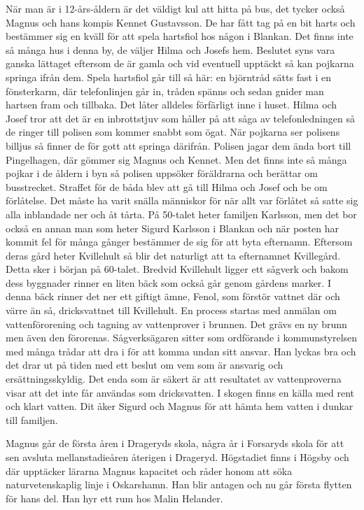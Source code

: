 När man är i 12-års-åldern är det väldigt kul att hitta på bus, det tycker också Magnus och hans kompis Kennet Gustavsson. De har fått tag på en bit harts och bestämmer sig en kväll för att spela hartsfiol hos någon i Blankan. Det finns inte så många hus i denna by, de väljer Hilma och Josefs hem. Beslutet syns vara ganska lättaget eftersom de är gamla och vid eventuell upptäckt så kan pojkarna springa ifrån dem. Spela hartsfiol går till så här: en björntråd sätts fast i en fönsterkarm, där telefonlinjen går in, tråden spänns och sedan gnider man hartsen fram och tillbaka. Det låter alldeles förfärligt inne i huset. Hilma och Josef tror att det är en inbrottstjuv som håller på att såga av telefonledningen så de ringer till polisen som kommer snabbt som ögat. När pojkarna ser polisens billjus så finner de för gott att springa därifrån. Polisen jagar dem ända bort till Pingelhagen, där gömmer sig Magnus och Kennet. Men det finns inte så många pojkar i de åldern i byn så polisen uppsöker föräldrarna och berättar om busstrecket. Straffet för de båda blev att gå till Hilma och Josef och be om förlåtelse. Det måste ha varit snälla människor för när allt var förlåtet så satte sig alla inblandade ner och åt tårta.
På 50-talet heter familjen Karlsson, men det bor också en annan man som heter Sigurd Karlsson i Blankan och när posten har kommit fel för många gånger bestämmer de sig för att byta efternamn. Eftersom deras gård heter Kvillehult så blir det naturligt att ta efternamnet Kvillegård. Detta sker i början på 60-talet.
Bredvid Kvillehult ligger ett sågverk och bakom dess byggnader rinner en liten bäck som också går genom gårdens marker. I denna bäck rinner det ner ett giftigt ämne, Fenol, som förstör vattnet där och värre än så, dricksvattnet till Kvillehult. En process startas med anmälan om vattenförorening och tagning av vattenprover i brunnen. Det grävs en ny brunn men även den förorenas. Sågverksägaren sitter som ordförande i kommunstyrelsen med många trådar att dra i för att komma undan sitt ansvar. Han lyckas bra och det drar ut på tiden med ett beslut om vem som är ansvarig och ersättningsskyldig. Det enda som är säkert är att resultatet av vattenproverna visar att det inte får användas som dricksvatten. I skogen finns en källa med rent och klart vatten. Dit åker Sigurd och Magnus för att hämta hem vatten i dunkar till familjen.

Magnus går de första åren i Drageryds skola, några år i Forsaryds skola för att sen avsluta mellanstadieåren återigen i Drageryd. Högstadiet finns i Högsby och där upptäcker lärarna Magnus kapacitet och råder honom att söka naturvetenskaplig linje i Oskarshamn. Han blir antagen och nu går första flytten för hans del. Han hyr ett rum hos Malin Helander.


